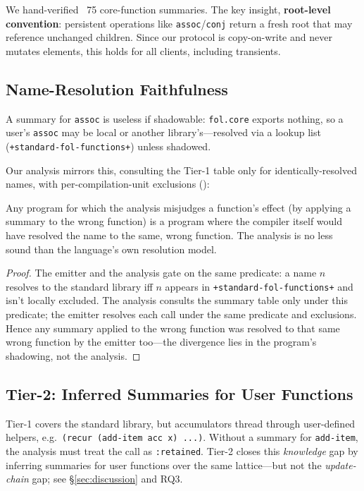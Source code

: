 \documentclass[sigplan,review,anonymous]{acmart}
\begin{document}
We hand-verified ~75 core-function summaries. The key insight, \textbf{root-level convention}: persistent operations like \texttt{assoc}/\texttt{conj} return a fresh root that may reference unchanged children. Since our protocol is copy-on-write and never mutates elements, this holds for all clients, including transients.

\subsection{Name-Resolution Faithfulness}
\label{sec:nameres}

A summary for \texttt{assoc} is useless if shadowable: \texttt{fol.core} exports nothing, so a user's \texttt{assoc} may be local or another library's---resolved via a lookup list (\texttt{+standard-fol-functions+}) unless shadowed.

Our analysis mirrors this, consulting the Tier-1 table only for identically-resolved names, with per-compilation-unit exclusions ():

\begin{lemma}
\label{lem:nameres}
Any program for which the analysis misjudges a function's effect (by applying a summary to the wrong function) is a program where the compiler itself would have resolved the name to the same, wrong function. The analysis is no less sound than the language's own resolution model.
\end{lemma}

\begin{proof}
The emitter and the analysis gate on the same predicate: a name $n$ resolves to the standard library iff $n$ appears in \texttt{+standard-fol-functions+} and isn't locally excluded. The analysis consults the summary table only under this predicate; the emitter resolves each call under the same predicate and exclusions. Hence any summary applied to the wrong function was resolved to that same wrong function by the emitter too---the divergence lies in the program's shadowing, not the analysis.
\end{proof}

\subsection{Tier-2: Inferred Summaries for User Functions}
\label{sec:tier2}

Tier-1 covers the standard library, but accumulators thread through user-defined helpers, e.g.\ \texttt{(recur (add-item acc x) ...)}. Without a summary for \texttt{add-item}, the analysis must treat the call as \texttt{:retained}. Tier-2 closes this \emph{knowledge} gap by inferring summaries for user functions over the same lattice---but not the \emph{update-chain} gap; see §\ref{sec:discussion} and RQ3.
\end{document}
